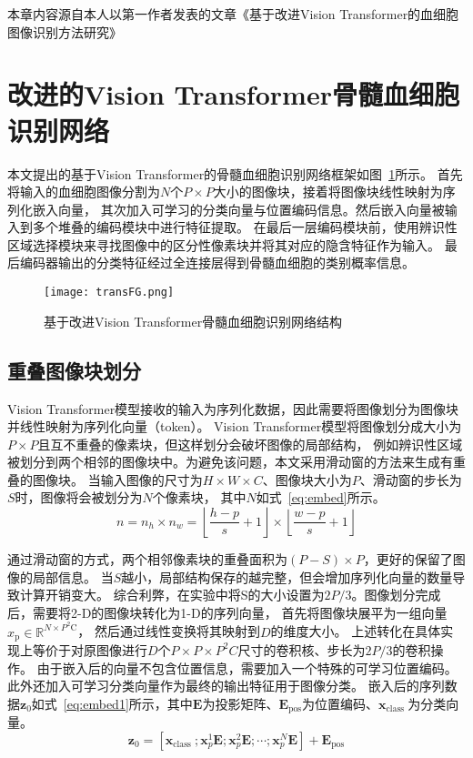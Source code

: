 本章内容源自本人以第一作者发表的文章《基于改进Vision Transformer的血细胞图像识别方法研究》\cite{SWGC202206005}

\section{改进的Vision Transformer骨髓血细胞识别网络}

本文提出的基于Vision Transformer的骨髓血细胞识别网络框架如图~\ref{fig:vit}所示。
首先将输入的血细胞图像分割为$N$个$P \times P$大小的图像块，接着将图像块线性映射为序列化嵌入向量，
其次加入可学习的分类向量与位置编码信息。然后嵌入向量被输入到多个堆叠的编码模块中进行特征提取。
在最后一层编码模块前，使用辨识性区域选择模块来寻找图像中的区分性像素块并将其对应的隐含特征作为输入。
最后编码器输出的分类特征经过全连接层得到骨髓血细胞的类别概率信息。

\begin{figure} 
   \centering   
   \texttt{[image: transFG.png]}   
   \caption{基于改进Vision Transformer骨髓血细胞识别网络结构}   
   \label{fig:vit} 
\end{figure}  

\subsection{重叠图像块划分}
Vision Transformer模型接收的输入为序列化数据，因此需要将图像划分为图像块并线性映射为序列化向量（token）。
Vision Transformer模型将图像划分成大小为$P \times P$且互不重叠的像素块，但这样划分会破坏图像的局部结构，
例如辨识性区域被划分到两个相邻的图像块中。为避免该问题，本文采用滑动窗的方法来生成有重叠的图像块。
当输入图像的尺寸为$H \times W \times C$、图像块大小为$P$、滑动窗的步长为$S$时，图像将会被划分为$N$个像素块，
其中$N$如式~\ref{eq:embed}所示。
\begin{equation}
  n=n_{h} \times n_{w}=\left\lfloor\frac{h-p}{s}+1\right\rfloor \times\left\lfloor\frac{w-p}{s}+1\right\rfloor
  \label{eq:embed}
\end{equation}

通过滑动窗的方式，两个相邻像素块的重叠面积为$(P-S) \times P$，更好的保留了图像的局部信息。
当$S$越小，局部结构保存的越完整，但会增加序列化向量的数量导致计算开销变大。
综合利弊，在实验中将S的大小设置为$2P/3$。图像划分完成后，需要将2-D的图像块转化为1-D的序列向量，
首先将图像块展平为一组向量$x_{\mathrm{p}} \in \mathbb{R}^{N \times P^{2} \mathrm{C}}$，
然后通过线性变换将其映射到$D$的维度大小。
上述转化在具体实现上等价于对原图像进行$D$个$P \times P \times P^2C$尺寸的卷积核、步长为$2P/3$的卷积操作。
由于嵌入后的向量不包含位置信息，需要加入一个特殊的可学习位置编码。
此外还加入可学习分类向量作为最终的输出特征用于图像分类。
嵌入后的序列数据$\mathbf{z}_{0}$如式~\ref{eq:embed1}所示，其中$\boldsymbol{E}$为投影矩阵、$\boldsymbol{E}_{\mathrm{pos}}$为位置编码、$\boldsymbol{x}_{\text {class }}$为分类向量。
\begin{equation}
    \mathbf{z}_{0}=\left[\boldsymbol{x}_{\text {class }} ; \boldsymbol{x}_{p}^{1} \boldsymbol{E} ; \boldsymbol{x}_{p}^{2} \boldsymbol{E} ; \cdots ; \boldsymbol{x}_{p}^{N} \boldsymbol{E}\right]+\boldsymbol{E}_{\mathrm{pos}}
    \label{eq:embed1}
\end{equation}

